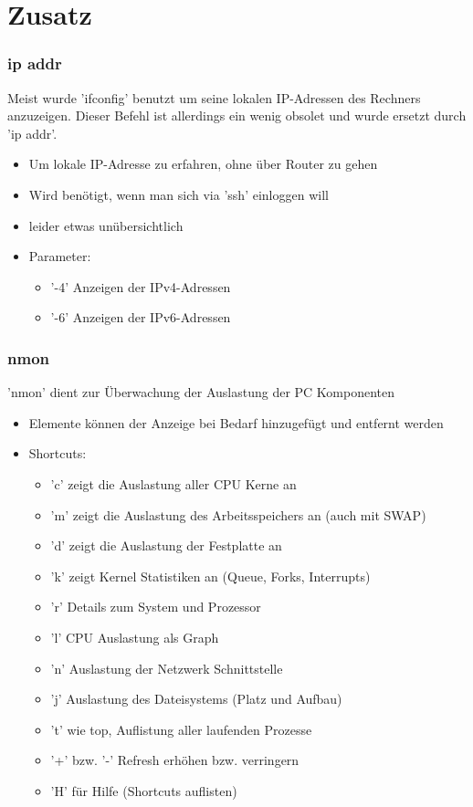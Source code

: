 \documentclass[12pt,utf8]{beamer}
\begin{document}
\section{Zusatz}
\begin{frame}
\frametitle{ip addr}
Meist wurde 'ifconfig' benutzt um seine lokalen IP-Adressen des Rechners anzuzeigen. Dieser Befehl ist allerdings ein wenig obsolet und wurde ersetzt durch 'ip addr'.
\begin{itemize}
	\item Um lokale IP-Adresse zu erfahren, ohne über Router zu gehen
	\item Wird benötigt, wenn man sich via 'ssh' einloggen will
	\item leider etwas unübersichtlich
	\item Parameter:
	\begin{itemize}
		\item '-4' Anzeigen der IPv4-Adressen
		\item '-6' Anzeigen der IPv6-Adressen
	\end{itemize}
\end{itemize}
\end{frame}

\begin{frame}
\frametitle{nmon}
'nmon' dient zur Überwachung der Auslastung der PC Komponenten
\begin{itemize}
	\item Elemente können der Anzeige bei Bedarf hinzugefügt und entfernt werden
	\item Shortcuts:
	\begin{itemize}[<+->]
		\item 'c' zeigt die Auslastung aller CPU Kerne an
		\item 'm' zeigt die Auslastung des Arbeitsspeichers an (auch mit SWAP)
		\item 'd' zeigt die Auslastung der Festplatte an
		\item 'k' zeigt Kernel Statistiken an (Queue, Forks, Interrupts)
		\item 'r' Details zum System und Prozessor
		\item 'l' CPU Auslastung als Graph
		\item 'n' Auslastung der Netzwerk Schnittstelle
		\item 'j' Auslastung des Dateisystems (Platz und Aufbau)
		\item 't' wie top, Auflistung aller laufenden Prozesse
		\item '+' bzw. '-' Refresh erhöhen bzw. verringern
		\item 'H' für Hilfe (Shortcuts auflisten)
	\end{itemize}
\end{itemize}
\end{frame}
\end{document}
